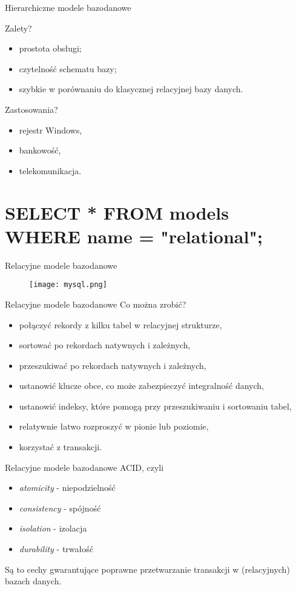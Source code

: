 \begin{frame}[fragile]{Hierarchiczne modele bazodanowe}

	Zalety?
	\begin{itemize}
		\item prostota obsługi;
		\item czytelność schematu bazy;
		\item szybkie w porównaniu do klasycznej relacyjnej bazy danych.
	\end{itemize}

	Zastosowania?
	\begin{itemize}
		\item rejestr Windows,
		\item bankowość,
		\item telekomunikacja.
	\end{itemize}
\end{frame}

\section{SELECT * FROM models WHERE name = "relational";}

\begin{frame}{Relacyjne modele bazodanowe}
	\begin{figure}[t]
		\centering
		\texttt{[image: mysql.png]}
	\end{figure}
\end{frame}

\begin{frame}[fragile]{Relacyjne modele bazodanowe}
	Co można zrobić?
	\begin{itemize}
		\item połączyć rekordy z kilku tabel w relacyjnej strukturze,
		\item sortować po rekordach natywnych i zależnych,
		\item przeszukiwać po rekordach natywnych i zależnych,
		\item ustanowić klucze obce, co może zabezpieczyć integralność danych,
		\item ustanowić indeksy, które pomogą przy przeszukiwaniu i sortowaniu tabel,
		\item relatywnie łatwo rozproszyć w pionie lub poziomie,
		\item korzystać z transakcji.
	\end{itemize}
\end{frame}

\begin{frame}[fragile]{Relacyjne modele bazodanowe}
	ACID, czyli
	\begin{itemize}
		\item \emph{atomicity} - niepodzielność
		\item \emph{consistency} - spójność
		\item \emph{isolation} - izolacja
		\item \emph{durability} - trwałość
	\end{itemize}
	
	Są to cechy gwarantujące poprawne przetwarzanie transakcji w (relacyjnych) bazach danych.
\end{frame}


